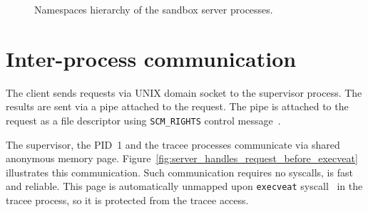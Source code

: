 \documentclass[en]{pracamgr}
\begin{document}
\begin{figure}[h]
\caption{Namespaces hierarchy of the sandbox server processes.}
\label{fig:server_namespaces}
\end{figure}

\section{Inter-process communication}

The client sends requests via UNIX domain socket to the supervisor process. The results are sent via a pipe attached to the request. The pipe is attached to the request as a file descriptor using \texttt{SCM\_RIGHTS} control message~\cite{man_unix}.

The supervisor, the PID~1 and the tracee processes communicate via shared anonymous memory page. Figure~\ref{fig:server_handles_request_before_execveat} illustrates this communication. Such communication requires no syscalls, is fast and reliable. This page is automatically unmapped upon \texttt{execveat} syscall~\cite{man_execveat} in the tracee process, so it is protected from the tracee access.
\end{document}
